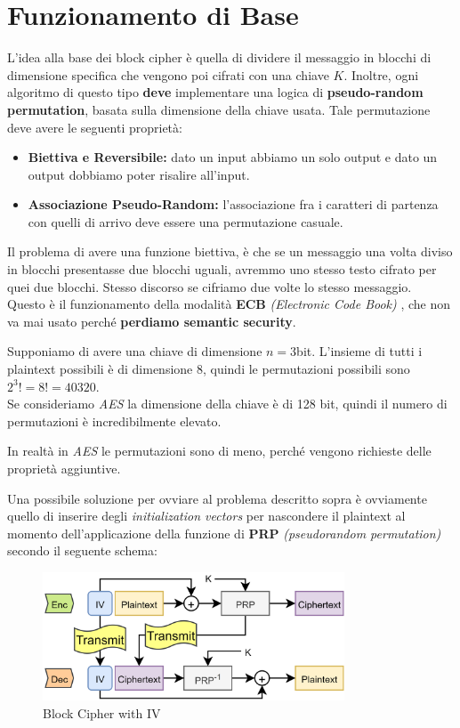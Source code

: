 \section{Funzionamento di Base}
L'idea alla base dei block cipher è quella di dividere il messaggio in blocchi di dimensione specifica che vengono poi cifrati con una chiave $K$. Inoltre, ogni algoritmo di questo tipo \textbf{deve} implementare una logica di \textbf{pseudo-random permutation}, basata sulla dimensione della chiave usata. Tale permutazione deve avere le seguenti proprietà:
\begin{property}
\begin{itemize}
    \item \textbf{Biettiva e Reversibile:} dato un input abbiamo un solo output e dato un output dobbiamo poter risalire all'input.
    \item \textbf{Associazione Pseudo-Random:} l'associazione fra i caratteri di partenza con quelli di arrivo deve essere una permutazione casuale. 
\end{itemize}
\end{property}
Il problema di avere una funzione biettiva, è che se un messaggio una volta diviso in blocchi presentasse due blocchi uguali, avremmo uno stesso testo cifrato per quei due blocchi. Stesso discorso se cifriamo due volte lo stesso messaggio.\\
Questo è il funzionamento della modalità \textbf{ECB} \textit{(Electronic Code Book)} , che non va mai usato perché \textbf{perdiamo semantic security}.\\
\begin{remark}Supponiamo di avere una chiave di dimensione $n=3$bit. L'insieme di tutti i plaintext possibili è di dimensione 8, quindi le permutazioni possibili sono $2^3!=8!=40320$.\\
Se consideriamo \textit{AES} la dimensione della chiave è di 128 bit, quindi il numero di permutazioni è incredibilmente elevato. 
\end{remark}
\begin{note}In realtà in \textit{AES} le permutazioni sono di meno, perché vengono richieste delle proprietà aggiuntive.
\end{note}
Una possibile soluzione per ovviare al problema descritto sopra è ovviamente quello di inserire degli \textit{initialization vectors} per nascondere il plaintext al momento dell'applicazione della funzione di \textbf{PRP} \textit{(pseudorandom permutation)} secondo il seguente schema:
\pagebreak
\begin{figure}[ht]
    \centering
    \includegraphics[width=0.8\textwidth]{image/blockiv.png}
    \caption{Block Cipher with IV}
    \label{fig:blockiv}
\end{figure}\\
